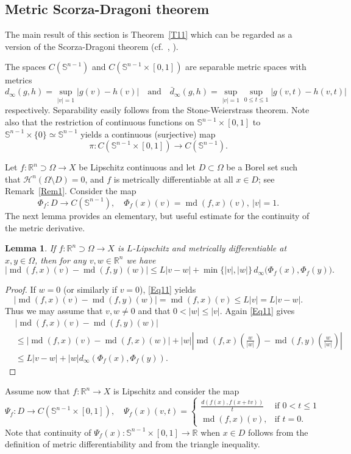 \documentclass[12pt,leqno]{amsart}
\newtheorem{lemma}[theorem]{Lemma}
\theoremstyle{definition}
\newcommand{\bbbr}{\mathbb R}
\newcommand{\Sph}{\mathbb S}
\def\H{{\mathcal H}}
\def\md{\operatorname{md}}
\numberwithin{theorem}{section} \numberwithin{equation}{section}
\begin{document}
\subsection{Metric Scorza-Dragoni theorem}
\label{MSDT}
The main result of this section is Theorem~\ref{T11} which can be regarded as a version of the Scorza-Dragoni theorem (cf.\,  \cite[Theorem~3.8]{dacorogna}, \cite[Theorem~6.35]{FL}).

The spaces $C(\Sph^{n-1})$ and $C(\Sph^{n-1}\times [0,1])$ are separable metric spaces with metrics
$$
d_\infty(g,h)=\sup_{|v|=1}|g(v)-h(v)|
\quad
\text{and}
\quad
\bar{d}_\infty(g,h)=\sup_{|v|=1}\sup_{0\leq t\leq 1} |g(v,t)-h(v,t)|
$$
respectively. Separability easily follows from the Stone-Weierstrass theorem.
Note also that the restriction of continuous functions on $\Sph^{n-1}\times [0,1]$ to $\Sph^{n-1}\times \{ 0\}\simeq\Sph^{n-1}$ yields a continuous (surjective) map
$$
\pi: C(\Sph^{n-1}\times [0,1])\to C(\Sph^{n-1}).
$$

Let $f:\bbbr^n\supset\Omega\to X$ be Lipschitz continuous and let $D\subset\Omega$ be a Borel set such that $\H^n(\Omega\setminus D)=0$, and $f$ is metrically differentiable at all $x\in D$; see Remark~\ref{Rem1}.
Consider the map
$$
\Phi_f:D\to C(\Sph^{n-1}),
\quad
\Phi_f(x)(v)=\md (f,x)(v),\ |v|=1.
$$
The next lemma provides an elementary, but useful estimate for the continuity of the metric derivative.
\begin{lemma}
If $f:\bbbr^n\supset\Omega\to X$ is $L$-Lipschitz and metrically differentiable at $x,y\in\Omega$, then for any $v,w\in\bbbr^n$ we have
\begin{equation}
\label{Eq12}
|\md (f,x)(v)-\md (f,y)(w)|\leq L|v-w|+\min\{|v|,|w|\}\,d_\infty\big(\Phi_f(x),\Phi_f(y)\big).
\end{equation}
\end{lemma}
\begin{proof}
If $w=0$ (or similarly if $v=0$), \eqref{Eq11} yields
$$
|\md(f,x)(v)-\md(f,y)(w)|=\md(f,x)(v)\leq L|v|=L|v-w|.
$$
Thus we may assume that $v,w\neq 0$ and that $0<|w|\leq |v|$. Again \eqref{Eq11} gives
\begin{equation*}
\begin{split}
&|\md(f,x)(v)-\md(f,y)(w)|\\
&\leq
|\md(f,x)(v)-\md(f,x)(w)|
+
|w|\left|\md(f,x)\left(\frac{w}{|w|}\right)-\md(f,y)\left(\frac{w}{|w|}\right)\right|\\
&\leq
L|v-w|+|w|d_\infty(\Phi_f(x),\Phi_f(y)).
\end{split}
\end{equation*}
\end{proof}
Assume now that $f:\bbbr^n\to X$ is Lipschitz and consider the map
$$
\Psi_f:D\to C(\Sph^{n-1}\times [0,1]),
\quad
\Psi_f(x)(v,t)=
\begin{cases}
{\displaystyle\frac{d(f(x),f(x+tv))}{t}} & \text{if $0<t\leq 1$}\\
\md(f,x)(v), & \text{if $t=0$.}
\end{cases}
$$
Note that continuity of $\Psi_f(x):\Sph^{n-1}\times [0,1]\to\bbbr$ when $x\in D$ follows from the definition of metric differentiability and from the triangle inequality.
\end{document}

